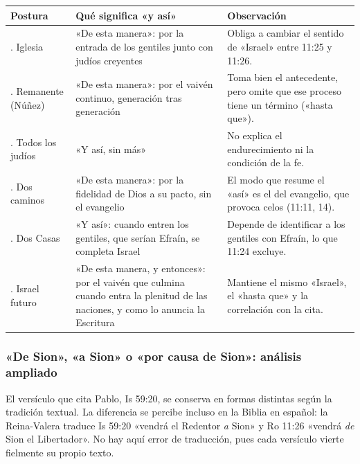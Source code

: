 \begin{center}\footnotesize
\renewcommand{\arraystretch}{1.25}
\begin{tabular}{>{\RaggedRight\arraybackslash}p{2.9cm}>{\RaggedRight\arraybackslash}p{4.4cm}>{\RaggedRight\arraybackslash}p{6.4cm}}
\toprule
\textbf{Postura} & \textbf{Qué significa «y así»} & \textbf{Observación}\\
\midrule
1. Iglesia & «De esta manera»: por la entrada de los gentiles junto con judíos creyentes & Obliga a cambiar el sentido de «Israel» entre 11:25 y 11:26.\\
2. Remanente (Núñez) & «De esta manera»: por el vaivén continuo, generación tras generación & Toma bien el antecedente, pero omite que ese proceso tiene un término («hasta que»).\\
3. Todos los judíos & «Y así, sin más» & No explica el endurecimiento ni la condición de la fe.\\
4. Dos caminos & «De esta manera»: por la fidelidad de Dios a su pacto, sin el evangelio & El modo que resume el «así» es el del evangelio, que provoca celos (11:11, 14).\\
5. Dos Casas & «Y así»: cuando entren los gentiles, que serían Efraín, se completa Israel & Depende de identificar a los gentiles con Efraín, lo que 11:24 excluye.\\
6. Israel futuro & «De esta manera, y entonces»: por el vaivén que culmina cuando entra la plenitud de las naciones, y como lo anuncia la Escritura & Mantiene el mismo «Israel», el «hasta que» y la correlación con la cita.\\
\bottomrule
\end{tabular}\end{center}

\subsubsection*{«De Sion», «a Sion» o «por causa de Sion»: análisis ampliado}

El versículo que cita Pablo, Is 59:20, se conserva en formas distintas según la tradición textual. La diferencia se percibe incluso en la Biblia en español: la Reina-Valera traduce Is 59:20 «vendrá el Redentor \emph{a} Sion» y Ro 11:26 «vendrá \emph{de} Sion el Libertador». No hay aquí error de traducción, pues cada versículo vierte fielmente su propio texto.


